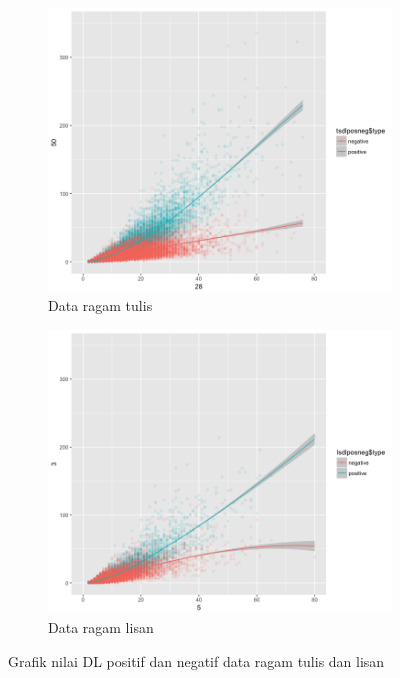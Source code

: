 \begin{figure}
\centering

\begin{subfigure}{.49\linewidth}
  \centering
  \includegraphics[width=1\linewidth] {pics/tulis_DLposneg.png} 
	\caption{Data ragam tulis}
	\label{fig:tulis_DLposneg} 
\end{subfigure}
%
\begin{subfigure}{.49\linewidth}
  \centering
  \includegraphics[width=1\linewidth]{pics/lisan_DLposneg.png} 
	\caption{Data ragam lisan}
	\label{fig:lisan_DLposneg} 
\end{subfigure}

\caption{Grafik nilai DL positif dan negatif data ragam tulis dan lisan}
\label{fig:DL_posneg}
\end{figure}


